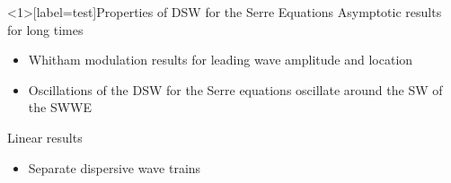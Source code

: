 \documentclass[pdf]{beamer}
\begin{document}
\begin{frame}<1>[label=test]{Properties of DSW for the Serre Equations}
	Asymptotic results for long times
	\begin{itemize}
		\item Whitham modulation results for leading wave amplitude and location \pause
		\item Oscillations of the DSW for the Serre equations oscillate around the SW of the SWWE \newline 
		\pause
	\end{itemize}
	Linear results
		\begin{itemize}
			\item Separate dispersive wave trains
		\end{itemize}
\end{frame}
\end{document}
